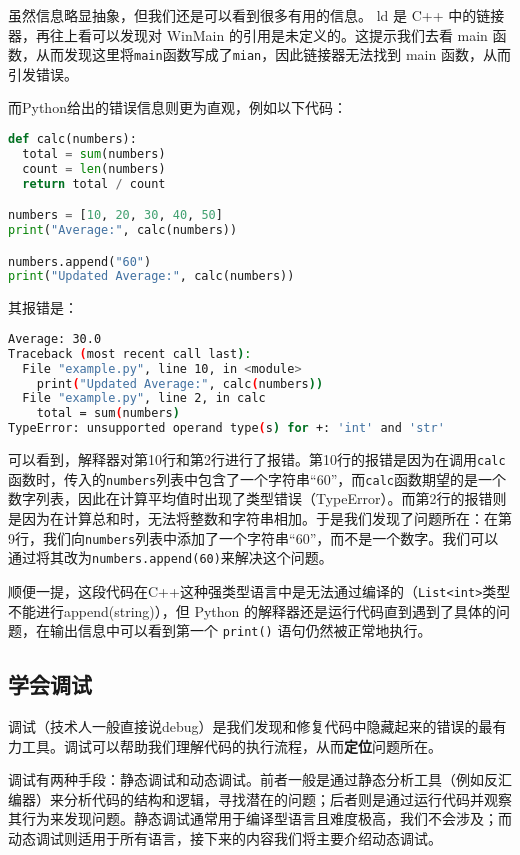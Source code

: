 \documentclass[../main.tex]{subfiles}
\begin{document}
虽然信息略显抽象，但我们还是可以看到很多有用的信息。 ld 是 C++ 中的链接器，再往上看可以发现对 WinMain 的引用是未定义的。这提示我们去看 main 函数，从而发现这里将\texttt{main}函数写成了\texttt{mian}，因此链接器无法找到 main 函数，从而引发错误。

而Python给出的错误信息则更为直观，例如以下代码：

\begin{lstlisting}[language=Python]
def calc(numbers):
  total = sum(numbers)
  count = len(numbers)
  return total / count

numbers = [10, 20, 30, 40, 50]
print("Average:", calc(numbers))

numbers.append("60")
print("Updated Average:", calc(numbers))
\end{lstlisting}

其报错是：
\begin{lstlisting}[language=bash]
Average: 30.0
Traceback (most recent call last):
  File "example.py", line 10, in <module>
    print("Updated Average:", calc(numbers))
  File "example.py", line 2, in calc
    total = sum(numbers)
TypeError: unsupported operand type(s) for +: 'int' and 'str'
\end{lstlisting}

可以看到，解释器对第10行和第2行进行了报错。第10行的报错是因为在调用\texttt{calc}函数时，传入的\texttt{numbers}列表中包含了一个字符串“60”，而\texttt{calc}函数期望的是一个数字列表，因此在计算平均值时出现了类型错误（TypeError）。而第2行的报错则是因为在计算总和时，无法将整数和字符串相加。于是我们发现了问题所在：在第9行，我们向\texttt{numbers}列表中添加了一个字符串“60”，而不是一个数字。我们可以通过将其改为\texttt{numbers.append(60)}来解决这个问题。

顺便一提，这段代码在C++这种强类型语言中是无法通过编译的（\texttt{List<int>}类型不能进行append(string)），但 Python 的解释器还是运行代码直到遇到了具体的问题，在输出信息中可以看到第一个 \texttt{print()} 语句仍然被正常地执行。

\subsection{学会调试}\label{subsec:debugging}

调试（技术人一般直接说debug）是我们发现和修复代码中隐藏起来的错误的最有力工具。调试可以帮助我们理解代码的执行流程，从而\textbf{定位}问题所在。

调试有两种手段：静态调试和动态调试。前者一般是通过静态分析工具（例如反汇编器）来分析代码的结构和逻辑，寻找潜在的问题；后者则是通过运行代码并观察其行为来发现问题。静态调试通常用于编译型语言且难度极高，我们不会涉及；而动态调试则适用于所有语言，接下来的内容我们将主要介绍动态调试。
\end{document}
